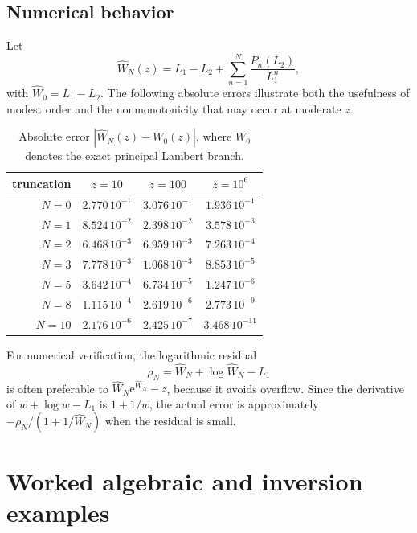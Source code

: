 \documentclass[11pt]{article}
\theoremstyle{pltheorem}
\newcommand{\e}{\mathrm e}
\newcommand{\abs}[1]{\left|#1\right|}
\begin{document}
\subsection{Numerical behavior}

Let
\begin{equation}\label{eq:WN-def}
 \widehat W_N(z)=L_1-L_2+\sum_{n=1}^{N}\frac{P_n(L_2)}{L_1^n},
\end{equation}
with \(\widehat W_0=L_1-L_2\).  The following absolute errors illustrate both the usefulness of modest order and the nonmonotonicity that may occur at moderate \(z\).

\begin{table}[htbp]
\centering
\small
\caption{Absolute error \(\abs{\widehat W_N(z)-W_0(z)}\), where \(W_0\) denotes the exact principal Lambert branch.}
\label{tab:W-errors}
\begin{tabular}{@{}rccc@{}}
\toprule
truncation & \(z=10\) & \(z=100\) & \(z=10^6\)\\
\midrule
\(N=0\)  & \(2.770\,10^{-1}\) & \(3.076\,10^{-1}\) & \(1.936\,10^{-1}\)\\
\(N=1\)  & \(8.524\,10^{-2}\) & \(2.398\,10^{-2}\) & \(3.578\,10^{-3}\)\\
\(N=2\)  & \(6.468\,10^{-3}\) & \(6.959\,10^{-3}\) & \(7.263\,10^{-4}\)\\
\(N=3\)  & \(7.778\,10^{-3}\) & \(1.068\,10^{-3}\) & \(8.853\,10^{-5}\)\\
\(N=5\)  & \(3.642\,10^{-4}\) & \(6.734\,10^{-5}\) & \(1.247\,10^{-6}\)\\
\(N=8\)  & \(1.115\,10^{-4}\) & \(2.619\,10^{-6}\) & \(2.773\,10^{-9}\)\\
\(N=10\) & \(2.176\,10^{-6}\) & \(2.425\,10^{-7}\) & \(3.468\,10^{-11}\)\\
\bottomrule
\end{tabular}
\end{table}

For numerical verification, the logarithmic residual
\begin{equation}\label{eq:W-log-residual}
 \rho_N=\widehat W_N+\log \widehat W_N-L_1
\end{equation}
is often preferable to \(\widehat W_N\e^{\widehat W_N}-z\), because it avoids overflow.  Since the derivative of \(w+\log w-L_1\) is \(1+1/w\), the actual error is approximately
\(-\rho_N/(1+1/\widehat W_N)\) when the residual is small.

\section{Worked algebraic and inversion examples}
\label{sec:worked-examples}
\end{document}

